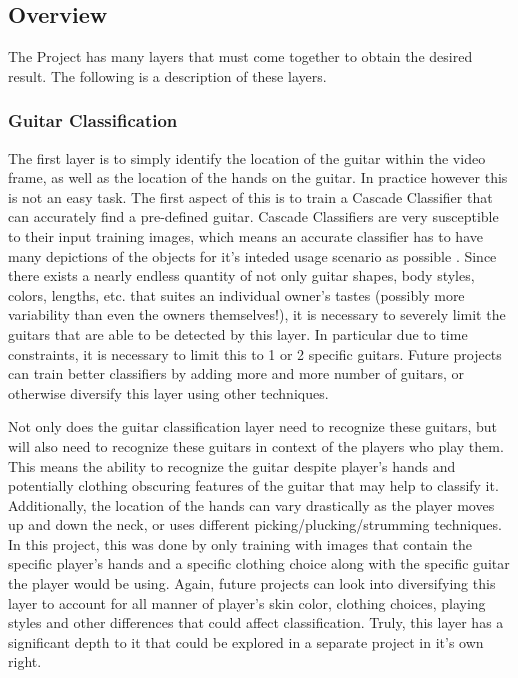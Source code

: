 \subsection{Overview}
The \project Project has many layers that must come together to obtain the desired result.
The following is a description of these layers.
\subsubsection{Guitar Classification}
The first layer is to simply identify the location of the guitar within the video frame,
as well as the location of the hands on the guitar.
In practice however this is not an easy task.
The first aspect of this is to train a Cascade Classifier that can accurately find a pre-defined guitar.
Cascade Classifiers are very susceptible to their input training images,
which means an accurate classifier has to have many depictions of the objects
for it's inteded usage scenario as possible \cite{opencv,codingrobin}.
Since there exists a nearly endless quantity of not only guitar shapes, body styles, colors, lengths, etc.
that suites an individual owner's tastes (possibly more variability than even the owners themselves!),
it is necessary to severely limit the guitars that are able to be detected by this layer.
In particular due to time constraints, it is necessary to limit this to 1 or 2 specific guitars.
Future projects can train better classifiers by adding more and more number of guitars,
or otherwise diversify this layer using other techniques.
\par
Not only does the guitar classification layer need to recognize these guitars,
but will also need to recognize these guitars in context of the players who play them.
This means the ability to recognize the guitar despite player's hands and potentially clothing obscuring
features of the guitar that may help to classify it.
Additionally, the location of the hands can vary drastically as the player moves up and down the neck,
or uses different picking/plucking/strumming techniques.
In this project, this was done by only training with images that contain the specific player's hands
and a specific clothing choice along with the specific guitar the player would be using.
Again, future projects can look into diversifying this layer to account for all manner of player's
skin color, clothing choices, playing styles and other differences that could affect classification.
Truly, this layer has a significant depth to it that could be explored in a separate project in it's own right.
